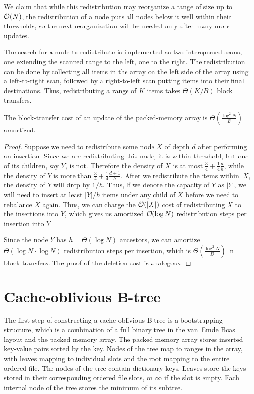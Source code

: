 We claim that while this redistribution may reorganize a range of size up
to $\mathcal{O}(N)$, the redistribution of a node puts all nodes below it well within
their thresholds, so the next reorganization will be needed only after many more
updates.

The search for a node to redistribute is implemented as two interspersed scans,
one extending the scanned range to the left, one to the right. The
redistribution can be done by collecting all items in the array on the left side
of the array using a left-to-right scan, followed by a right-to-left scan
putting items into their final destinations. Thus,
redistributing a range of $K$ items takes $\Theta(K/B)$ block transfers.


\begin{theorem}
The block-transfer cost of an update of the packed-memory array
is $\Theta(\frac{\log^2 N}{B})$ amortized.
\end{theorem}

\begin{proof}
Suppose we need to redistribute some node $X$ of depth $d$ after performing
an insertion. Since we are redistributing this node, it is within threshold,
but one of its children, say $Y$, is not.
Therefore the density of $X$ is at most
$\frac{3}{4}+\frac{1}{4}\frac{d}{h}$, while the density of $Y$ is more than
$\frac{3}{4}+\frac{1}{4}\frac{d+1}{h}$. After we redistribute the items
within~$X$, the density of $Y$ will drop by $1/h$. Thus, if we denote
the capacity of $Y$ as $|Y|$, we will need to insert at least $|Y|/h$ items
under any child of $X$ before we need to rebalance $X$ again.
Thus, we can charge the $\mathcal{O}(|X|)$ cost of redistributing $X$ to the
insertions into $Y$, which gives us amortized $\mathcal{O}(\log N)$
redistribution steps per insertion into $Y$.

Since the node $Y$ has $h=\Theta(\log N)$ ancestors, we can amortize
$\Theta(\log N \cdot \log N)$ redistribution steps per insertion, which is
$\Theta(\frac{\log^2 N}{B})$ in block transfers. The proof of the deletion
cost is analogous.
\end{proof}

\section{Cache-oblivious B-tree}
The first step of constructing a cache-oblivious B-tree is a bootstrapping
structure, which is a combination of a full binary tree in
the van~Emde Boas layout and the packed memory array.
The packed memory array stores inserted key-value pairs sorted by the key.
Nodes of the tree map to ranges in the array, with leaves mapping
to individual slots and the root mapping to the entire ordered file.
The nodes of the tree contain dictionary keys.
Leaves store the keys stored in their corresponding ordered file slots,
or $\infty$ if the slot is empty. Each internal node of the tree
stores the minimum of its subtree.

